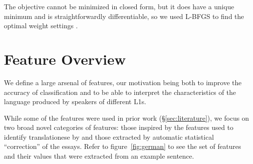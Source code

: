 \documentclass[11pt,letterpaper]{article}
\newcommand{\citep}[1]{\cite{#1}}
\newcommand{\citet}[1]{\newcite{#1}}
\newcommand{\Sref}[1]{\S\ref{#1}}
\newcommand{\fref}[1]{figure~\ref{#1}}
\begin{document}
The objective cannot be minimized in closed form, but it does have a unique minimum and is straightforwardly differentiable, so we used L-BFGS to find the optimal weight settings \citep{lbfgs}.

\section{Feature Overview}
\label{sec:features}
We define a large arsenal of features, our motivation being both to
improve the accuracy of classification and to be able to interpret the
characteristics of the language produced by speakers of different
L1s.

While some of the features were used in prior work (\Sref{sec:literature}), we focus on two broad novel categories of features: those inspired by the
features used to identify translationese by \citet{vered:noam:shuly} and those extracted by automatic statistical ``correction'' of the essays. Refer to \fref{fig:german} to see the set of features and their values that were extracted from an example sentence.
\end{document}
